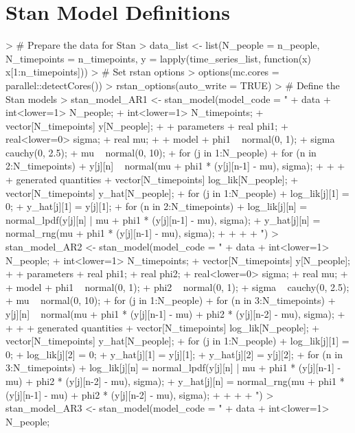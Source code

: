 \documentclass{article}
\begin{document}
\section{Stan Model Definitions}

\begin{Schunk}
\begin{Sinput}
> # Prepare the data for Stan
> data_list <- list(N_people = n_people, N_timepoints = n_timepoints, y = lapply(time_series_list, function(x) x[1:n_timepoints]))
> # Set rstan options
> options(mc.cores = parallel::detectCores())
> rstan_options(auto_write = TRUE)
> # Define the Stan models
> stan_model_AR1 <- stan_model(model_code = "
+ data {
+   int<lower=1> N_people;
+   int<lower=1> N_timepoints;
+   vector[N_timepoints] y[N_people];
+ }
+ parameters {
+   real phi1;
+   real<lower=0> sigma;
+   real mu;
+ }
+ model {
+   phi1 ~ normal(0, 1);
+   sigma ~ cauchy(0, 2.5);
+   mu ~ normal(0, 10);
+   for (j in 1:N_people) {
+     for (n in 2:N_timepoints) {
+       y[j][n] ~ normal(mu + phi1 * (y[j][n-1] - mu), sigma);
+     }
+   }
+ }
+ generated quantities {
+   vector[N_timepoints] log_lik[N_people];
+   vector[N_timepoints] y_hat[N_people];
+   for (j in 1:N_people) {
+     log_lik[j][1] = 0;
+     y_hat[j][1] = y[j][1];
+     for (n in 2:N_timepoints) {
+       log_lik[j][n] = normal_lpdf(y[j][n] | mu + phi1 * (y[j][n-1] - mu), sigma);
+       y_hat[j][n] = normal_rng(mu + phi1 * (y[j][n-1] - mu), sigma);
+     }
+   }
+ }
+ ")
> stan_model_AR2 <- stan_model(model_code = "
+ data {
+   int<lower=1> N_people;
+   int<lower=1> N_timepoints;
+   vector[N_timepoints] y[N_people];
+ }
+ parameters {
+   real phi1;
+   real phi2;
+   real<lower=0> sigma;
+   real mu;
+ }
+ model {
+   phi1 ~ normal(0, 1);
+   phi2 ~ normal(0, 1);
+   sigma ~ cauchy(0, 2.5);
+   mu ~ normal(0, 10);
+   for (j in 1:N_people) {
+     for (n in 3:N_timepoints) {
+       y[j][n] ~ normal(mu + phi1 * (y[j][n-1] - mu) + phi2 * (y[j][n-2] - mu), sigma);
+     }
+   }
+ }
+ generated quantities {
+   vector[N_timepoints] log_lik[N_people];
+   vector[N_timepoints] y_hat[N_people];
+   for (j in 1:N_people) {
+     log_lik[j][1] = 0;
+     log_lik[j][2] = 0;
+     y_hat[j][1] = y[j][1];
+     y_hat[j][2] = y[j][2];
+     for (n in 3:N_timepoints) {
+       log_lik[j][n] = normal_lpdf(y[j][n] | mu + phi1 * (y[j][n-1] - mu) + phi2 * (y[j][n-2] - mu), sigma);
+       y_hat[j][n] = normal_rng(mu + phi1 * (y[j][n-1] - mu) + phi2 * (y[j][n-2] - mu), sigma);
+     }
+   }
+ }
+ ")
> stan_model_AR3 <- stan_model(model_code = "
+ data {
+   int<lower=1> N_people;
}
\end{Sinput}
\end{Schunk}
\end{document}
